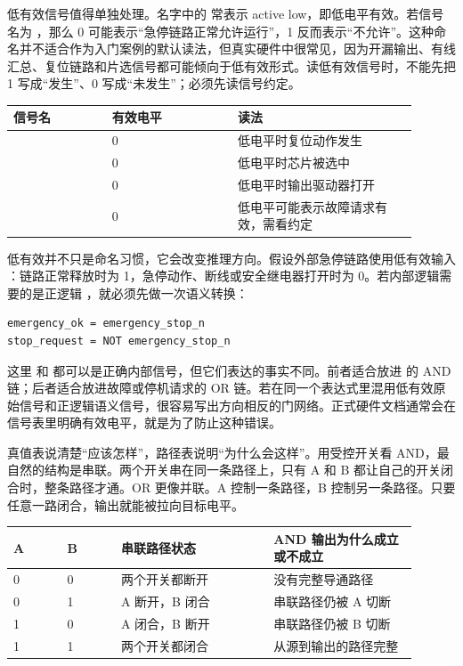 低有效信号值得单独处理。名字中的  常表示 active low，即低电平有效。若信号名为 ，那么 0 可能表示“急停链路正常允许运行”，1 反而表示“不允许”。这种命名并不适合作为入门案例的默认读法，但真实硬件中很常见，因为开漏输出、有线汇总、复位链路和片选信号都可能倾向于低有效形式。读低有效信号时，不能先把 1 写成“发生”、0 写成“未发生”；必须先读信号约定。

\begin{longtable}{L{0.22\linewidth}L{0.28\linewidth}L{0.4\linewidth}}
\toprule
信号名 & 有效电平 & 读法 \\
\midrule
{} & 0 & 低电平时复位动作发生 \\
 & 0 & 低电平时芯片被选中 \\
 & 0 & 低电平时输出驱动器打开 \\
 & 0 & 低电平可能表示故障请求有效，需看约定 \\
\bottomrule
\end{longtable}

低有效并不只是命名习惯，它会改变推理方向。假设外部急停链路使用低有效输入 ：链路正常释放时为 1，急停动作、断线或安全继电器打开时为 0。若内部逻辑需要的是正逻辑 ，就必须先做一次语义转换：

\begin{lstlisting}
emergency_ok = emergency_stop_n
stop_request = NOT emergency_stop_n
\end{lstlisting}

这里  和  都可以是正确内部信号，但它们表达的事实不同。前者适合放进  的 AND 链；后者适合放进故障或停机请求的 OR 链。若在同一个表达式里混用低有效原始信号和正逻辑语义信号，很容易写出方向相反的门网络。正式硬件文档通常会在信号表里明确有效电平，就是为了防止这种错误。

真值表说清楚“应该怎样”，路径表说明“为什么会这样”。用受控开关看 AND，最自然的结构是串联。两个开关串在同一条路径上，只有 A 和 B 都让自己的开关闭合时，整条路径才通。OR 更像并联。A 控制一条路径，B 控制另一条路径。只要任意一路闭合，输出就能被拉向目标电平。

\begin{longtable}{L{0.12\linewidth}L{0.12\linewidth}L{0.34\linewidth}L{0.32\linewidth}}
\toprule
A & B & 串联路径状态 & AND 输出为什么成立或不成立 \\
 & 0 & 两个开关都断开 & 没有完整导通路径 \\
0 & 1 & A 断开，B 闭合 & 串联路径仍被 A 切断 \\
1 & 0 & A 闭合，B 断开 & 串联路径仍被 B 切断 \\
1 & 1 & 两个开关都闭合 & 从源到输出的路径完整 \\
\bottomrule
\end{longtable}

